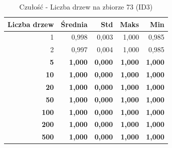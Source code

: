 \begin{table}[htbp]
\centering
\small
\setlength{\tabcolsep}{6pt}
\renewcommand{\arraystretch}{1.2}
\caption{Czułość - Liczba drzew na zbiorze 73 (ID3)}
\label{tab:ID3_tree_count_73_recall}
\begin{tabular}{r|r|r|r|r}
\toprule
Liczba drzew & Średnia & Std & Maks & Min \\
\hline
1 & 0,998 & 0,003 & 1,000 & 0,985 \\
2 & 0,997 & 0,004 & 1,000 & 0,985 \\
\textbf{5} & \textbf{1,000} & \textbf{0,000} & \textbf{1,000} & \textbf{1,000} \\
\textbf{10} & \textbf{1,000} & \textbf{0,000} & \textbf{1,000} & \textbf{1,000} \\
\textbf{20} & \textbf{1,000} & \textbf{0,000} & \textbf{1,000} & \textbf{1,000} \\
\textbf{50} & \textbf{1,000} & \textbf{0,000} & \textbf{1,000} & \textbf{1,000} \\
\textbf{100} & \textbf{1,000} & \textbf{0,000} & \textbf{1,000} & \textbf{1,000} \\
\textbf{200} & \textbf{1,000} & \textbf{0,000} & \textbf{1,000} & \textbf{1,000} \\
\textbf{500} & \textbf{1,000} & \textbf{0,000} & \textbf{1,000} & \textbf{1,000} \\
\bottomrule
\end{tabular}
\end{table}